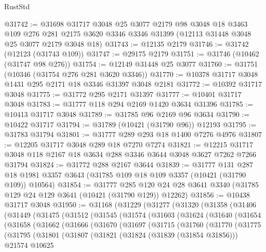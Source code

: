 \begin{lexlean}{RustStd}
\begin{coremodule}
@31742 := @31698
    @31717
    @3048
    @25
    @3077
    @2179
    @98
    @3048
    @18
    @3463
    @109
    @276
    @281
    @2175
    @3620
    @3346
    @3346
    @31399
    (@12113 @31448 @3048 @25 @3077 @2179 @3048 @18)
@31743 := @12135 @2179
@31746 := @31742 (@12123 (@31743 @109))
@31747 := @29175 @2179
@31751 := @31746 (@10462 (@31747 @98 @276))
@31754 := @12149 @31448 @25 @3077
@31760 := @31751 (@10346 (@31754 @276 @281 @3620 @3346))
@31770 := @10378 @31717 @3048 @1431 @295 @2171 @18 @3346 @31397 @3048 @2181
@31772 := @10392 @31717 @3048
@31775 := @31772 @295 @2171 @31397
@31777 := @10401 @31717 @3048
@31783 := @31777 @118 @294 @2169 @1420 @3634 @31396
@31785 := @10413 @31717 @3048
@31789 := @31785 @96 @2169 @96 @3634
@31790 := @10422 @31717
@31794 := @31789 (@10421 (@31790 @96)) @12193
@31795 := @31783 @31794
@31801 := @31777 @289 @293 @18 @1400 @7276 @4976
@31807 := @12205 @31717 @3048 @289 @18 @7270 @7274
@31821 := @12215 @31717 @3048 @118 @2167 @18 @3634 @288 @3346 @3644 @3048 @3627 @7262 @7266 @31794
@31824 := @31772 @288 @2167 @3644
@31839 := @31777
    @131
    @287
    @18
    @1981
    @3357
    @3643
    (@31785 @109 @18 @109 @3357 (@10421 (@31790 @109)) @10564)
@31854 := @31777
    @285
    @120
    @24
    @28
    @3641
    @3340
    (@31785 @129 @24 @129 @3641 (@10421 (@31790 @129)) @12262)
@31856 := @10438 @31717 @3048
@31950 := @31168
    (@31229
      (@31277
        (@31320
          (@31358
            (@31406
              (@31449
                (@31475
                  (@31512
                    (@31545
                      (@31574
                        (@31603
                          (@31624
                            (@31640
                              (@31654
                                (@31658
                                  (@31662
                                    (@31666
                                      (@31670
                                        (@31697
                                          (@31715
                                            (@31760
                                              (@31770
                                                (@31775
                                                  (@31795
                                                    (@31801
                                                      (@31807
                                                        (@31821
                                                          (@31824 (@31839 (@31854 @31856)))
                                                          @21574
                                                          @10625

\end{coremodule}
\end{lexlean}
